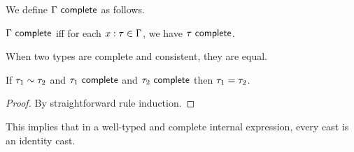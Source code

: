 We define $\Gamma~\mathsf{complete}$ as follows.
\begin{defn}
$\Gamma~\mathsf{complete}$ iff for each $x : \tau \in \Gamma$, we have $\tau~\mathsf{complete}$.
\end{defn}

When two types are complete and consistent, they are equal.

\begin{lem} If $\tau_1 \sim \tau_2$ and $\tau_1~\mathsf{complete}$ and $\tau_2~\mathsf{complete}$ then $\tau_1 = \tau_2$.
\end{lem}
\begin{proof} By straightforward rule induction. \end{proof}

This implies that in a well-typed and complete internal expression, every cast is 
an identity cast.

